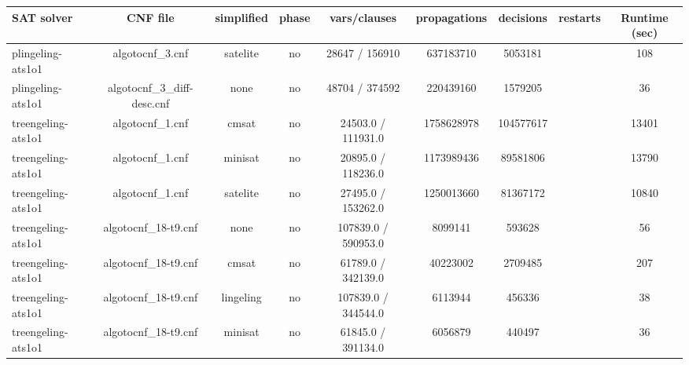 \begin{appendices}
\begin{table}[p]
  \begin{center}
    \begin{tabular}{l|cccccccc}
        \textbf{SAT solver} & \textbf{CNF file} & \textbf{simplified} & \textbf{phase} & \textbf{vars/clauses} & \textbf{propagations} & \textbf{decisions} & \textbf{restarts} & \textbf{Runtime (sec)} \\
      \hline
  plingeling-ats1o1              & algotocnf\_3.cnf               & satelite   & no    & 28647 / 156910 & 637183710 & 5053181   &            & 108 \\ %
  plingeling-ats1o1              & algotocnf\_3\_diff-desc.cnf    & none       & no    & 48704 / 374592 & 220439160 & 1579205   &            & 36 \\ %
  treengeling-ats1o1             & algotocnf\_1.cnf               & cmsat      & no    & 24503.0 / 111931.0 & 1758628978 & 104577617 &            & 13401 \\ %
  treengeling-ats1o1             & algotocnf\_1.cnf               & minisat    & no    & 20895.0 / 118236.0 & 1173989436 & 89581806  &            & 13790 \\ %
  treengeling-ats1o1             & algotocnf\_1.cnf               & satelite   & no    & 27495.0 / 153262.0 & 1250013660 & 81367172  &            & 10840 \\ %
  treengeling-ats1o1             & algotocnf\_18-t9.cnf           & none       & no    & 107839.0 / 590953.0 & 8099141   & 593628    &            & 56 \\ %
  treengeling-ats1o1             & algotocnf\_18-t9.cnf           & cmsat      & no    & 61789.0 / 342139.0 & 40223002  & 2709485   &            & 207 \\ %
  treengeling-ats1o1             & algotocnf\_18-t9.cnf           & lingeling  & no    & 107839.0 / 344544.0 & 6113944   & 456336    &            & 38 \\ %
  treengeling-ats1o1             & algotocnf\_18-t9.cnf           & minisat    & no    & 61845.0 / 391134.0 & 6056879   & 440497    &            & 36 \\ %

\end{tabular}
\end{center}
\end{table}
\end{appendices}
